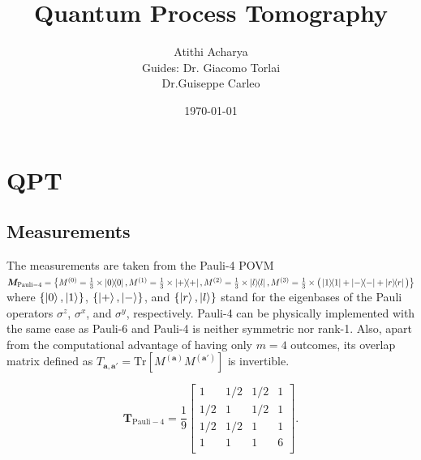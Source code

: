 \documentclass[a4paper]{article}
\title{Quantum Process Tomography\\}
\author{Atithi Acharya\\[0.1cm]{\small Guides: Dr. Giacomo Torlai \\ \small Dr.Guiseppe Carleo}}
\date{\today}
\begin{document}
\maketitle
\section*{QPT}
\subsection*{Measurements}
The measurements are taken from the Pauli-4 POVM 
$\boldsymbol{M}_{\text{Pauli}-4}=\big\{M^{(0)} = \frac{1}{3}\times\ketbra{0}{0},
M^{(1)}= \frac{1}{3}\times\ketbra{+}{+}, M^{(2)}= \frac{1}{3}\times\ketbra{l}{l}, 
M^{(3)}= \frac{1}{3}\times\big(\ketbra{1}{1}+\ketbra{-}{-}+\ketbra{r}{r}\big)\big\}$
where $\{\ket{0}, \ket{1}\}$, $\{\ket{+}, \ket{-}\}$, and $\{\ket{r},\ket{l}\}$  
stand for the eigenbases of the Pauli operators $\sigma^{z}$, $\sigma^{x}$, and $\sigma^y$, respectively. 
Pauli-4 can be physically implemented with the same ease as Pauli-6 and Pauli-4 is neither symmetric nor rank-1.
Also, apart from the computational advantage of having only $m=4$ outcomes, its overlap matrix defined as $T_{\boldsymbol{a},\boldsymbol{a}'} = 
\text{Tr}\left[  M^{(\boldsymbol{a})} M^{(\boldsymbol{a}')} \right]$ is invertible.

\begin{equation}
\boldsymbol{T}_{\text{Pauli}-4}=
\frac{1}{9}\left[ {\begin{array}{cccc}
   1   & 1/2 & 1/2 & 1 \\
   1/2 & 1   & 1/2 & 1 \\
   1/2 & 1/2 & 1   & 1 \\
   1   & 1   & 1 &   6 \\
    \end{array} } \right]. 
\end{equation}
 
\end{document}
